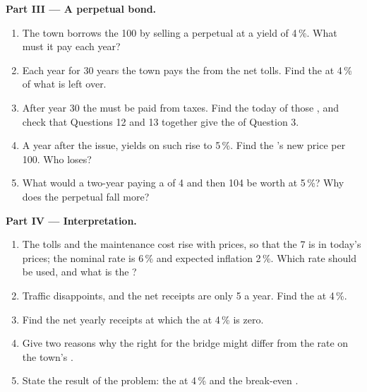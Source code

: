 \begin{problem}
\medskip
\noindent\textbf{Part III --- A perpetual bond.}
\begin{enumerate}[resume]
\item The town borrows the 100 by selling a perpetual  at a yield of 4\,\%. What  must it pay each year?
\item Each year for 30 years the town pays the  from the net tolls. Find the  at 4\,\% of what is left over.
\item After year 30 the  must be paid from taxes. Find the  today of those , and check that Questions 12 and 13 together give the  of Question 3.
\item A year after the issue, yields on such  rise to 5\,\%. Find the 's new price per 100. Who loses?
\item What would a two-year  paying a  of 4 and then 104 be worth at 5\,\%? Why does the perpetual  fall more?
\end{enumerate}

\medskip
\noindent\textbf{Part IV --- Interpretation.}
\begin{enumerate}[resume]
\item The tolls and the maintenance cost rise with prices, so that the 7 is in today's prices; the nominal rate is 6\,\% and expected inflation 2\,\%. Which rate should
  be used, and what is the ?
\item Traffic disappoints, and the net receipts are only 5 a year. Find the  at 4\,\%.
\item Find the net yearly receipts at which the  at 4\,\% is zero.
\item Give two reasons why the right  for the bridge might differ from the rate on the town's .
\item State the result of the problem: the  at 4\,\% and the break-even .
\end{enumerate}
\end{problem}

